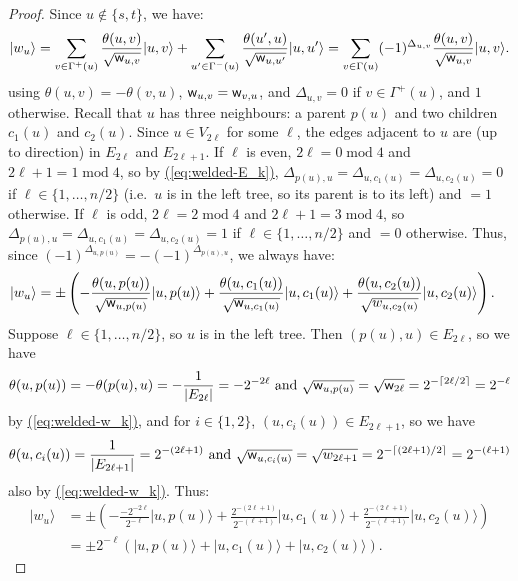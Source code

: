 \documentclass{theoretics}
\newcommand{\eq}[1]{\hyperref[eq:#1]{(\ref*{eq:#1})}}
\def\ket#1{{\lvert}#1\rangle}
\renewcommand{\>}{\rangle}
\newcommand{\<}{\langle}
\renewcommand{\(}{\left(}
\renewcommand{\)}{\right)}
\def\w{{\sf w}}
\begin{document}
\begin{proof}
Since $u\not\in \{s,t\}$, we have:
\begin{align*}
\ket{w_u} = \sum_{v\in\Gamma^+(u)}\frac{\theta(u,v)}{\sqrt{\w_{u,v}}}\ket{u,v}+\sum_{u'\in\Gamma^-(u)}\frac{\theta(u',u)}{\sqrt{\w_{u,u'}}}\ket{u,u'}
= \sum_{v\in\Gamma(u)}(-1)^{\Delta_{u,v}}\frac{\theta(u,v)}{\sqrt{\w_{u,v}}}\ket{u,v}.
\end{align*}
using $\theta(u,v)=-\theta(v,u)$, $\w_{u,v}=\w_{v,u}$, and $\Delta_{u,v}=0$ if $v\in\Gamma^+(u)$, and $1$ otherwise.
Recall that $u$ has three neighbours: a parent $p(u)$ and two children $c_1(u)$ and $c_2(u)$.
Since $u\in V_{2\ell}$ for some $\ell$, the edges adjacent to $u$ are (up to direction) in $E_{2\ell}$ and $E_{2\ell+1}$. If $\ell$ is even, $2\ell=0\;\mathrm{mod}\; 4$ and $2\ell+1=1\;\mathrm{mod}\; 4$, so by \eq{welded-E_k}, $\Delta_{p(u),u}=\Delta_{u,c_1(u)}=\Delta_{u,c_2(u)}=0$ if $\ell\in\{1,\dots,n/2\}$ (i.e.~$u$ is in the left tree, so its parent is to its left) and $=1$ otherwise. If $\ell$ is odd, $2\ell=2\;\mathrm{mod}\; 4$ and $2\ell+1=3\;\mathrm{mod}\; 4$, so $\Delta_{p(u),u}=\Delta_{u,c_1(u)}=\Delta_{u,c_2(u)}=1$ if $\ell\in\{1,\dots,n/2\}$ and $=0$ otherwise. Thus, since $(-1)^{\Delta_{u,p(u)}}=-(-1)^{\Delta_{p(u),u}}$, we always have:
\begin{align*}
\ket{w_u} &= \pm\left(-\frac{\theta(u,p(u))}{\sqrt{\w_{u,p(u)}}}\ket{u,p(u)}+\frac{\theta(u,c_1(u))}{\sqrt{\w_{u,c_1(u)}}}\ket{u,c_1(u)}+\frac{\theta(u,c_2(u))}{\sqrt{w_{u,c_2(u)}}}\ket{u,c_2(u)}\right).
\end{align*}
Suppose $\ell\in\{1,\dots,n/2\}$, so $u$ is in the left tree. Then $(p(u),u)\in E_{2\ell}$, so we have
$$\theta(u,p(u))=-\theta(p(u),u)=-\frac{1}{|E_{2\ell}|}=-2^{-2\ell}
\mbox{ and }
\sqrt{\w_{u,p(u)}}=\sqrt{\w_{2\ell}}=2^{-\lceil 2\ell/2\rceil }=2^{-\ell}$$
by \eq{welded-w_k}, and for $i\in\{1,2\}$, $(u,c_i(u))\in E_{2\ell+1}$, so we have
$$\theta(u,c_i(u))=\frac{1}{|E_{2\ell+1}|}=2^{-(2\ell+1)}
\mbox{ and }
\sqrt{\w_{u,c_i(u)}}=\sqrt{w_{2\ell+1}} = 2^{-\lceil (2\ell+1)/2\rceil }=2^{-(\ell+1)}
$$
also by \eq{welded-w_k}. Thus:
\begin{align*}
\ket{w_u} &= \pm\left( -\frac{-2^{-2\ell}}{2^{-\ell}}\ket{u,p(u)}+\frac{2^{-(2\ell+1)}}{2^{-(\ell+1)}}\ket{u,c_1(u)}+\frac{2^{-(2\ell+1)}}{2^{-(\ell+1)}}\ket{u,c_2(u)}\right)\\
&=\pm 2^{-\ell}\left(\ket{u,p(u)}+\ket{u,c_1(u)}+\ket{u,c_2(u)}\right).
\end{align*}


\end{proof}
\end{document}
